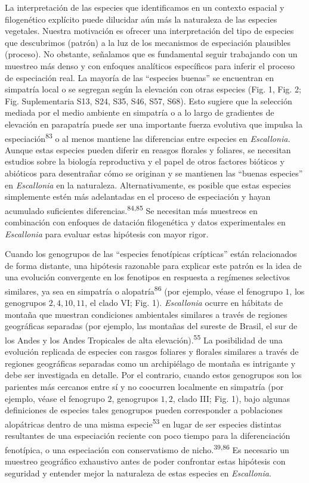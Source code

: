 \documentclass[
  11pt,
]{article}
\begin{document}
La interpretación de las especies que identificamos en un contexto espacial y filogenético explícito puede dilucidar aún más la naturaleza de las especies vegetales. Nuestra motivación es ofrecer una interpretación del tipo de especies que descubrimos (patrón) a la luz de los mecanismos de especiación plausibles (proceso). No obstante, señalamos que es fundamental seguir trabajando con un muestreo más denso y con enfoques analíticos específicos para inferir el proceso de especiación real. La mayoría de las ``especies buenas'' se encuentran en simpatría local o se segregan según la elevación con otras especies (Fig. 1, Fig. 2; Fig. Suplementaria S13, S24, S35, S46, S57, S68). Esto sugiere que la selección mediada por el medio ambiente en simpatría o a lo largo de gradientes de elevación en parapatría puede ser una importante fuerza evolutiva que impulsa la especiación\textsuperscript{83} o al menos mantiene las diferencias entre especies en \emph{Escallonia.} Aunque estas especies pueden diferir en reasgos florales y foliares, se necesitan estudios sobre la biología reproductiva y el papel de otros factores bióticos y abióticos para desentrañar cómo se originan y se mantienen las ``buenas especies'' en \emph{Escallonia} en la naturaleza. Alternativamente, es posible que estas especies simplemente estén más adelantadas en el proceso de especiación y hayan acumulado suficientes diferencias.\textsuperscript{84,85} Se necesitan más muestreos en combinación con enfoques de datación filogenética y datos experimentales en \emph{Escallonia} para evaluar estas hipótesis con mayor rigor.

Cuando los genogrupos de las ``especies fenotípicas crípticas'' están relacionados de forma distante, una hipótesis razonable para explicar este patrón es la idea de una evolución convergente en los fenotipos en respuesta a regímenes selectivos similares, ya sea en simpatría o alopatría\textsuperscript{86} (por ejemplo, véase el fenogrupo \(1\), los genogrupos \(2, 4, 10, 11\), el clado VI; Fig. 1). \emph{Escallonia} ocurre en hábitats de montaña que muestran condiciones ambientales similares a través de regiones geográficas separadas (por ejemplo, las montañas del sureste de Brasil, el sur de los Andes y los Andes Tropicales de alta elevación).\textsuperscript{55} La posibilidad de una evolución replicada de especies con rasgos foliares y florales similares a través de regiones geográficas separadas como un archipiélago de montaña es intrigante y debe ser investigada en detalle. Por el contrario, cuando estos genogrupos son los parientes más cercanos entre sí y no coocurren localmente en simpatría (por ejemplo, véase el fenogrupo \(2\), genogrupos \(1, 2\), clado III; Fig. 1), bajo algunas definiciones de especies tales genogrupos pueden corresponder a poblaciones alopátricas dentro de una misma especie\textsuperscript{53} en lugar de ser especies distintas resultantes de una especiación reciente con poco tiempo para la diferenciación fenotípica, o una especiación con conservatismo de nicho.\textsuperscript{39,86} Es necesario un muestreo geográfico exhaustivo antes de poder confrontar estas hipótesis con seguridad y entender mejor la naturaleza de estas especies en \emph{Escallonia}.
\end{document}
